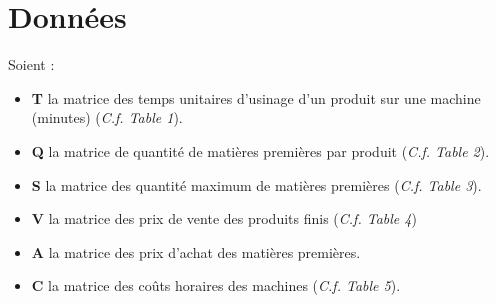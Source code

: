 
\section{Données}
Soient :
\begin{itemize}
  \item \textbf{T} la matrice des temps unitaires d'usinage d'un produit sur une
  machine (minutes) (\textsl{C.f. Table 1}).
  \item \textbf{Q} la matrice de quantité de matières premières par produit
  (\textsl{C.f. Table 2}).
  \item \textbf{S} la matrice des quantité maximum de matières premières
  (\textsl{C.f. Table 3}).
  \item \textbf{V} la matrice des prix de vente des produits finis (\textsl{C.f.
  Table 4})
  \item \textbf{A} la matrice des prix d'achat des matières premières.
  \item \textbf{C} la matrice des coûts horaires des machines (\textsl{C.f.
  Table 5}).
\end{itemize}
 
